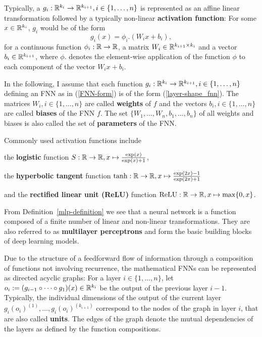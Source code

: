 Typically, a $g_i: \mathbb{R}^{k_i}\to \mathbb{R}^{k_{i+1}}, i\in \lbrace 1, \dots, n\rbrace$ is represented as an affine linear transformation followed by a typically non-linear \textbf{activation function}: For some $x\in\mathbb{R}^{k_i}$, $g_i$ would be of the form 
\begin{equation}\label{layer-shape_fnn}
g_i(x) = \phi_i.(W_i x + b_i),
\end{equation}
for a continuous function $\phi_i: \mathbb{R} \to \mathbb{R}$, a matrix $W_i \in \mathbb{R}^{k_{i+1}\times k_i}$ and a vector $b_i \in \mathbb{R}^{k_{i+1}}$, where $\phi.$ denotes the element-wise application of the function $\phi$ to each component of the vector $W_i x + b_i$.

In the following, I assume that each function $g_i: \mathbb{R}^{k_i}\to \mathbb{R}^{k_{i+1}}, i\in \lbrace 1, \dots, n\rbrace$ defining an FNN as in (\ref{FNN-form})  is of the form (\ref{layer-shape_fnn}). The matrices $W_i, i\in \lbrace 1,\dots, n\rbrace$ are called \textbf{weights} of $f$ and the vectors $b_i, i\in \lbrace 1,\dots, n\rbrace$ are called \textbf{biases} of the FNN $f$. The set $\lbrace W_1,\dots, W_n, b_1, \dots, b_n\rbrace$ of all weights and biases is also called the set of \textbf{parameters} of the FNN.

Commonly used activation functions include 

the \textbf{logistic} function $S: \mathbb{R} \to \mathbb{R}, x \mapsto \frac{\exp(x)}{\exp(x)+1}$, 

the \textbf{hyperbolic tangent} function $\tanh: \mathbb{R}\to \mathbb{R}, x\mapsto \frac{\exp(2x) - 1}{\exp(2x) + 1}$ 

and the \textbf{rectified linear unit (ReLU)} function $\mathrm{ReLU}: \mathbb{R} \to \mathbb{R}, x\mapsto \max\lbrace 0,x\rbrace$.

From Definition~\ref{mlp-definition} we see that a neural network is a function composed of a finite number of linear and non-linear transformations. They are also referred to as \textbf{multilayer perceptrons} and form the basic building blocks of deep learning models. 
 
Due to the structure of a feedforward flow of information through a composition of functions not involving recurrence, the mathematical FNNs can be represented as directed acyclic graphs: 
For a layer $i \in \lbrace 1,\dots, n\rbrace$, let $o_i := (g_{i-1} \circ \dots\circ g_1)(x) \in \mathbb{R}^{k_i}$ be the output of the previous layer $i-1$. Typically, the individual dimensions of the output of the current layer $g_i(o_i)^{(1)}, \dots, g_i(o_i)^{(k_{i+1})}$ correspond to the nodes of the graph in layer $i$, that are also called \textbf{units}. The edges of the graph denote the mutual dependencies of the layers as defined by the function compositions.

